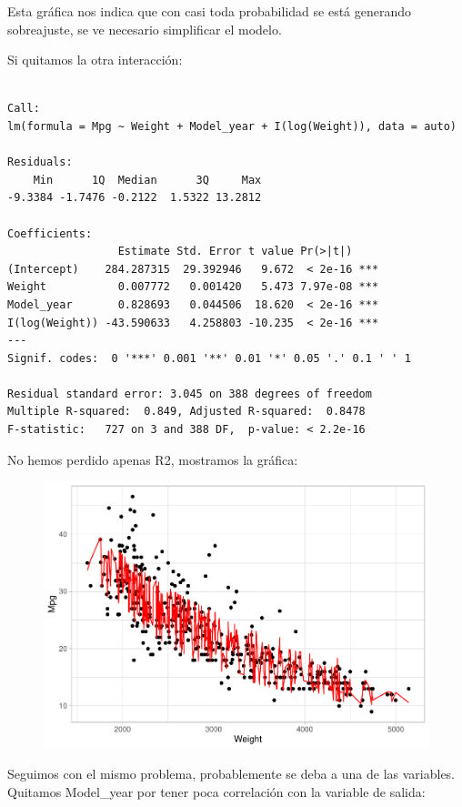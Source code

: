Esta gráfica nos indica que con casi toda probabilidad se está generando sobreajuste, se ve necesario simplificar el modelo.

Si quitamos la otra interacción:

\begin{verbatim}

Call:
lm(formula = Mpg ~ Weight + Model_year + I(log(Weight)), data = auto)

Residuals:
    Min      1Q  Median      3Q     Max 
-9.3384 -1.7476 -0.2122  1.5322 13.2812 

Coefficients:
                 Estimate Std. Error t value Pr(>|t|)    
(Intercept)    284.287315  29.392946   9.672  < 2e-16 ***
Weight           0.007772   0.001420   5.473 7.97e-08 ***
Model_year       0.828693   0.044506  18.620  < 2e-16 ***
I(log(Weight)) -43.590633   4.258803 -10.235  < 2e-16 ***
---
Signif. codes:  0 '***' 0.001 '**' 0.01 '*' 0.05 '.' 0.1 ' ' 1

Residual standard error: 3.045 on 388 degrees of freedom
Multiple R-squared:  0.849, Adjusted R-squared:  0.8478 
F-statistic:   727 on 3 and 388 DF,  p-value: < 2.2e-16
\end{verbatim}

No hemos perdido apenas R2, mostramos la gráfica:

\begin{figure}[H]\includegraphics[width=.9\linewidth]{img/Regresion_files/figure-latex/unnamed-chunk-21-1} \caption{}\end{figure}

Seguimos con el mismo problema, probablemente se deba a una de las variables. Quitamos Model\_year por tener poca correlación con la variable de salida:

